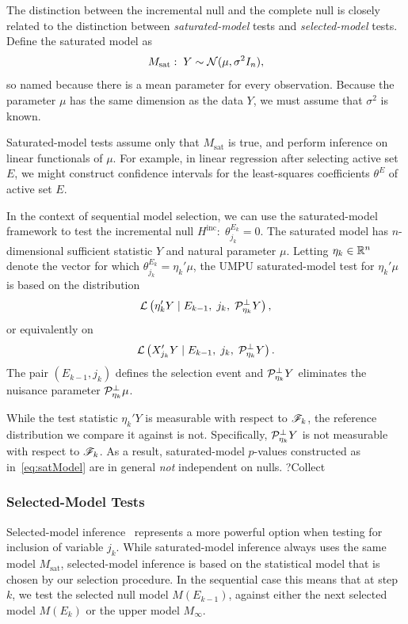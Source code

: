 \documentclass{article}
\begin{document}
The distinction between the incremental null and the complete null is closely related to the distinction between {\em saturated-model} tests and {\em selected-model} tests. Define the saturated model as
\[
M_{\text{sat}}:\; Y \sim \mathcal{N}(\mu, \sigma^2I_n),
\]
so named because there is a mean parameter for every observation. Because the parameter $\mu$ has the same dimension as the data $Y$, we must assume that $\sigma^2$ is known.

Saturated-model tests assume only that $M_{\text{sat}}$ is true, and perform inference on linear functionals of $\mu$. For example, in linear regression after selecting active set $E$, we might construct confidence intervals for the least-squares coefficients $\theta^E$ of active set $E$.

In the context of sequential model selection, we can use the saturated-model framework to test the incremental null $H^{\text{inc}}:\; \theta_{j_k}^{E_k} = 0$. The saturated model has $n$-dimensional sufficient statistic $Y$ and natural parameter $\mu$. Letting $\eta_k\in \mathbb{R}^n$ denote the vector for which $\theta_{j_k}^{E_k} = \eta_k'\mu$, the UMPU saturated-model test for $\eta_k'\mu$ is based on the distribution
\begin{equation}\label{eq:satModel}
\mathcal{L}\left( \eta_k'Y \mid E_{k-1}, \;j_k, \;\mathcal{P}_{\eta_k}^\perp Y \right),
\end{equation}
or equivalently on
\begin{equation}\label{eq:satModelEquiv}
\mathcal{L}\left( X_{j_k}'Y \mid E_{k-1}, \;j_k, \;\mathcal{P}_{\eta_k}^\perp Y \right).
\end{equation}
The pair $(E_{k-1}, j_k)$ defines the selection event and $\mathcal{P}_{\eta_k}^\perp Y$ eliminates the nuisance parameter $\mathcal{P}_{\eta_k}^\perp \mu$.

While the test statistic $\eta_k'Y$ is measurable with respect to $\mathscr{F}_k$, the reference distribution we compare it against is not. Specifically, $\mathcal{P}_{\eta_k}^\perp Y$ is not measurable with respect to $\mathscr{F}_k$. As a result, saturated-model $p$-values constructed as in~\eqref{eq:satModel} are in general {\em not} independent on nulls.
?Collect
\subsubsection{Selected-Model Tests}
Selected-model inference~\citep{fithian2014optimal} 
represents a more powerful option when testing for inclusion of variable $j_k$. While saturated-model inference always uses the same model $M_{\text{sat}}$, selected-model inference is based on the statistical model that is chosen by our selection procedure. In the sequential case this means that at step $k$, we test the selected null model $M(E_{k-1})$, against either the next selected model $M(E_k)$ or the upper model $M_\infty$.
\end{document}
